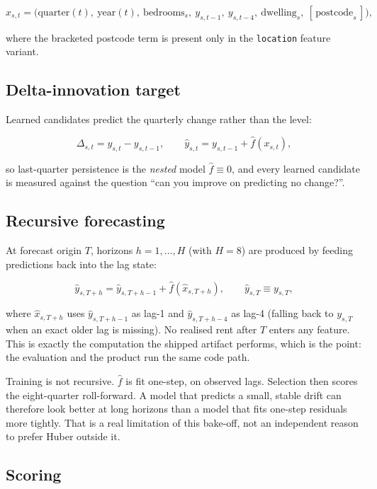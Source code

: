 \documentclass[11pt,a4paper]{article}
\begin{document}
\[
x_{s,t} = \big(\text{quarter}(t),\ \text{year}(t),\ \text{bedrooms}_s,\ y_{s,t-1},\ y_{s,t-4},\ \text{dwelling}_s,\ [\,\text{postcode}_s\,]\big),
\]

where the bracketed postcode term is present only in the \texttt{location} feature variant.

\subsection{Delta-innovation target}

Learned candidates predict the quarterly change rather than the level:

\[
\Delta_{s,t} = y_{s,t} - y_{s,t-1}, \qquad
\hat{y}_{s,t} = y_{s,t-1} + \hat{f}\!\left(x_{s,t}\right),
\]

so last-quarter persistence is the \emph{nested} model \(\hat f \equiv 0\), and every learned candidate is measured against the question ``can you improve on predicting no change?''.

\subsection{Recursive forecasting}

At forecast origin \(T\), horizons \(h = 1,\dots,H\) (with \(H = 8\)) are produced by feeding predictions back into the lag state:

\[
\hat{y}_{s,T+h} = \hat{y}_{s,T+h-1} + \hat{f}\!\left(\hat{x}_{s,T+h}\right),
\qquad \hat{y}_{s,T} \equiv y_{s,T},
\]

where \(\hat x_{s,T+h}\) uses \(\hat y_{s,T+h-1}\) as lag-1 and \(\hat y_{s,T+h-4}\) as lag-4 (falling back to \(y_{s,T}\) when an exact older lag is missing). No realised rent after \(T\) enters any feature. This is exactly the computation the shipped artifact performs, which is the point: the evaluation and the product run the same code path.

Training is not recursive. \(\hat f\) is fit one-step, on observed lags. Selection then scores the eight-quarter roll-forward. A model that predicts a small, stable drift can therefore look better at long horizons than a model that fits one-step residuals more tightly. That is a real limitation of this bake-off, not an independent reason to prefer Huber outside it.

\subsection{Scoring}
\end{document}

